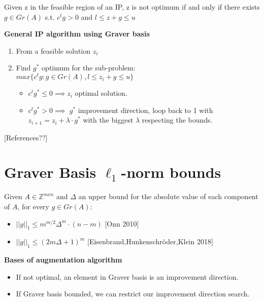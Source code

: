 \begin{proposition}
Given z in the feasible region of an IP, z is not optimum if and only if there exists $g \in Gr(A)$ s.t. $c^tg > 0$ and $l \leq z + g \leq u$
\end{proposition}

\textbf{General IP algorithm using Graver basis}
\begin{enumerate}
    \item From a feasible solution $z_i$
    \item Find $g^*$ optimum for the sub-problem: \vspace{4pt}\\
          $max\{c^tg : g \in Gr(A), l \leq z_i + g \leq u \}$ \vspace{4pt}
    \begin{itemize}
        \item $c^tg^* \leq 0 \implies z_i$ optimal solution.
        \item $c^tg^* > 0 \implies$ $g^*$ improvement direction, loop back to 1 with $z_{i+1} = z_i + \lambda \cdot g^*$ with the biggest $\lambda$ respecting the bounds.
    \end{itemize}
\end{enumerate}
\hspace{15pt} [References??]


\section{Graver Basis $\ell_1$-norm bounds}

\begin{proposition}
Given $A \in \mathbb{Z}^{mxn}$ and $\Delta$ an upper bound for the absolute value of each component of $A$, for every $g \in Gr(A)$:
\begin{itemize}
    \item $||g||_1 \leq m^{m/2}\Delta^m\cdot(n - m)$ \hspace{10pt}[Onn 2010]
    \item $||g||_1 \leq (2m \Delta + 1)^m$ \hspace{41pt}[Eisenbrand,Hunkenschröder,Klein 2018]
\end{itemize}
\end{proposition}

\textbf{Bases of augmentation algorithm}
\begin{itemize}
    \item If not optimal, an element in Graver basis is an improvement direction.
    \item If Graver basis bounded, we can restrict our improvement direction search.
\end{itemize}

